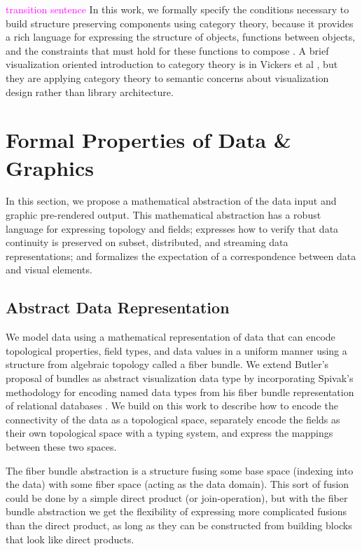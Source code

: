 \documentclass[journal]{IEEEtran}
\newcommand{\note}[1]{\textcolor{magenta}{#1}}
\theoremstyle{definition}
\theoremstyle{remark}
\begin{document}
\note{transition sentence}
In this work, we formally specify the conditions necessary to build structure preserving components using category theory, because it provides a rich language for expressing the structure of objects, functions between objects, and the constraints that must hold for these functions to compose \cite{wielsManagementEvolvingSpecifications1998,yorgeyMonoidsThemeVariations2012}. A brief visualization oriented introduction to category theory is in Vickers et al \cite{vickersUnderstandingVisualizationFormal2013}, but they are applying category theory to semantic concerns about visualization design rather than library architecture.


\section{Formal Properties of Data \& Graphics}
\label{sec:atct}
In this section, we propose a mathematical abstraction of the data input and graphic pre-rendered output. This mathematical abstraction has a robust language for expressing topology and fields; expresses how to verify that data continuity is preserved on subset, distributed, and streaming data representations; and formalizes the expectation of a correspondence between data and visual elements.

\subsection{Abstract Data Representation}
\label{sec:atct:fiber-bundles}
We model data using a mathematical representation of data that can encode topological properties, field types, and data values in a uniform manner using a structure from algebraic topology called a fiber bundle. We extend Butler's proposal of bundles as abstract visualization data type \cite{butlerVectorBundleClassesForm1992,butlerVisualizationModelBased1989} by incorporating Spivak's methodology for encoding named data types from his fiber bundle representation of relational databases \cite{spivakDatabasesAreCategories2010,spivakSimplicialDatabases2009}. We build on this work to describe how to encode the connectivity of the data as a topological space, separately encode the fields as their own topological space with a typing system, and express the mappings between these two spaces.

The fiber bundle abstraction is a structure fusing some \textcolor{base}{base space} (indexing into the data) with some \textcolor{fiber}{fiber space} (acting as the data domain). This sort of fusion could be done by a simple direct product (or join-operation), but with the fiber bundle abstraction we get the flexibility of expressing more complicated fusions than the direct product, as long as they can be constructed from building blocks that look like direct products.
\end{document}
